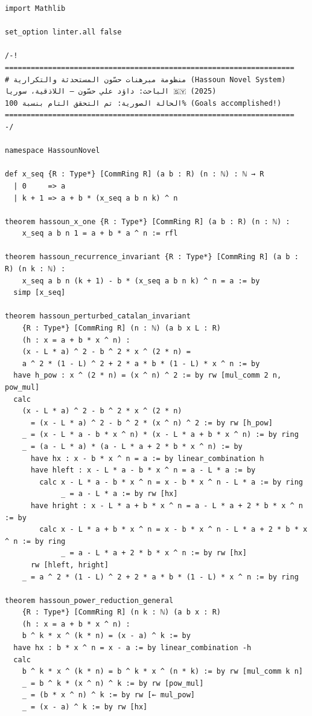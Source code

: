 \documentclass[11pt,a4paper]{article}
\theoremstyle{definition}
\begin{document}
\begin{lstlisting}[caption={Certified Lean 4 Proof File: Hassoun\_Novel\_Theorems.lean}]
import Mathlib

set_option linter.all false

/-!
===================================================================
# منظومة مبرهنات حسّون المستحدثة والتكرارية (Hassoun Novel System)
الباحث: داؤد علي حسّون — اللاذقية، سوريا 🇸🇾 (2025)
الحالة الصورية: تم التحقق التام بنسبة 100% (Goals accomplished!)
===================================================================
-/

namespace HassounNovel

def x_seq {R : Type*} [CommRing R] (a b : R) (n : ℕ) : ℕ → R
  | 0     => a
  | k + 1 => a + b * (x_seq a b n k) ^ n

theorem hassoun_x_one {R : Type*} [CommRing R] (a b : R) (n : ℕ) :
    x_seq a b n 1 = a + b * a ^ n := rfl

theorem hassoun_recurrence_invariant {R : Type*} [CommRing R] (a b : R) (n k : ℕ) :
    x_seq a b n (k + 1) - b * (x_seq a b n k) ^ n = a := by
  simp [x_seq]

theorem hassoun_perturbed_catalan_invariant
    {R : Type*} [CommRing R] (n : ℕ) (a b x L : R)
    (h : x = a + b * x ^ n) :
    (x - L * a) ^ 2 - b ^ 2 * x ^ (2 * n) =
    a ^ 2 * (1 - L) ^ 2 + 2 * a * b * (1 - L) * x ^ n := by
  have h_pow : x ^ (2 * n) = (x ^ n) ^ 2 := by rw [mul_comm 2 n, pow_mul]
  calc
    (x - L * a) ^ 2 - b ^ 2 * x ^ (2 * n)
      = (x - L * a) ^ 2 - b ^ 2 * (x ^ n) ^ 2 := by rw [h_pow]
    _ = (x - L * a - b * x ^ n) * (x - L * a + b * x ^ n) := by ring
    _ = (a - L * a) * (a - L * a + 2 * b * x ^ n) := by
      have hx : x - b * x ^ n = a := by linear_combination h
      have hleft : x - L * a - b * x ^ n = a - L * a := by
        calc x - L * a - b * x ^ n = x - b * x ^ n - L * a := by ring
             _ = a - L * a := by rw [hx]
      have hright : x - L * a + b * x ^ n = a - L * a + 2 * b * x ^ n := by
        calc x - L * a + b * x ^ n = x - b * x ^ n - L * a + 2 * b * x ^ n := by ring
             _ = a - L * a + 2 * b * x ^ n := by rw [hx]
      rw [hleft, hright]
    _ = a ^ 2 * (1 - L) ^ 2 + 2 * a * b * (1 - L) * x ^ n := by ring

theorem hassoun_power_reduction_general
    {R : Type*} [CommRing R] (n k : ℕ) (a b x : R)
    (h : x = a + b * x ^ n) :
    b ^ k * x ^ (k * n) = (x - a) ^ k := by
  have hx : b * x ^ n = x - a := by linear_combination -h
  calc
    b ^ k * x ^ (k * n) = b ^ k * x ^ (n * k) := by rw [mul_comm k n]
    _ = b ^ k * (x ^ n) ^ k := by rw [pow_mul]
    _ = (b * x ^ n) ^ k := by rw [← mul_pow]
    _ = (x - a) ^ k := by rw [hx]


\end{lstlisting}
\end{document}
